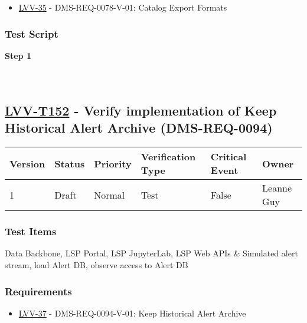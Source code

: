 \begin{itemize}
\tightlist
\item
  \href{https://jira.lsstcorp.org/browse/LVV-35}{LVV-35} -
  DMS-REQ-0078-V-01: Catalog Export Formats
\end{itemize}

\hypertarget{test-script-128}{%
\subsubsection{Test Script}\label{test-script-128}}

\textbf{Step 1}\\
~\\
~\\

\hypertarget{lvv-t152---verify-implementation-of-keep-historical-alert-archive-dms-req-0094}{%
\subsection{\texorpdfstring{\href{https://jira.lsstcorp.org/secure/Tests.jspa\#/testCase/LVV-T152}{LVV-T152}
- Verify implementation of Keep Historical Alert Archive
(DMS-REQ-0094)}{LVV-T152 - Verify implementation of Keep Historical Alert Archive (DMS-REQ-0094)}}\label{lvv-t152---verify-implementation-of-keep-historical-alert-archive-dms-req-0094}}

\begin{longtable}[]{@{}llllll@{}}
\toprule
Version & Status & Priority & Verification Type & Critical Event &
Owner\tabularnewline
\midrule
\endhead
1 & Draft & Normal & Test & False & Leanne Guy\tabularnewline
\bottomrule
\end{longtable}

\hypertarget{test-items-128}{%
\subsubsection{Test Items}\label{test-items-128}}

Data Backbone, LSP Portal, LSP JupyterLab, LSP Web APIs \& Simulated
alert stream, load Alert DB, observe access to Alert DB

\hypertarget{requirements-129}{%
\subsubsection{Requirements}\label{requirements-129}}

\begin{itemize}
\tightlist
\item
  \href{https://jira.lsstcorp.org/browse/LVV-37}{LVV-37} -
  DMS-REQ-0094-V-01: Keep Historical Alert Archive
\end{itemize}

